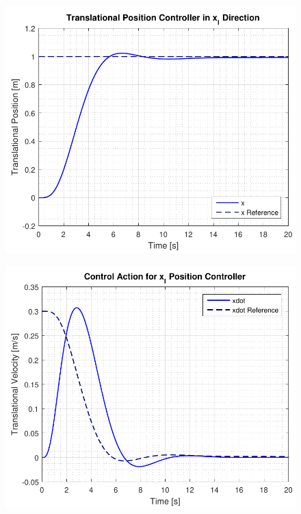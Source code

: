 \begin{minipage}{\linewidth}
    \begin{minipage}{0.46\linewidth}
        \begin{figure}[H]
            \includegraphics[scale=.5]{figures/positionControllersXY}
            \centering			
            \label{fig:positionControllersXY}
        \end{figure}
    \end{minipage}
    \hspace{0.03\linewidth}
    \begin{minipage}{0.46\linewidth}
        \begin{figure}[H]
            \includegraphics[scale=.5]{figures/positionControllersXYAction}

\end{figure}
\end{minipage}
\end{minipage}
